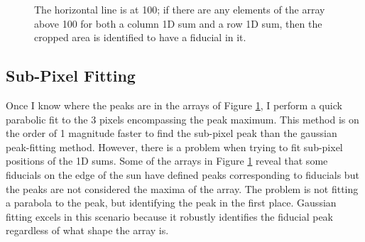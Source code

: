 \documentclass[10pt]{scrartcl}
\begin{document}
\begin{figure}[!ht]
\begin{subfigure}[b]{.3\linewidth}
    \end{subfigure}
    \caption{The horizontal line is at 100; if there are any elements of the array above 100 for both a column 1D sum and a row 1D sum, then the cropped area is identified to have a fiducial in it.}
    \label{lotsofplot}
\end{figure}

\subsection{Sub-Pixel Fitting} %
\label{sub:sub_pixel_fitting}
Once I know where the peaks are in the arrays of Figure \ref{lotsofplot}, I perform a quick parabolic fit to the 3 pixels encompassing the peak maximum. This method is on the order of 1 magnitude faster to find the sub-pixel peak than the gaussian peak-fitting method. However, there is a problem when trying to fit sub-pixel positions of the 1D sums. Some of the arrays in Figure \ref{lotsofplot} reveal that some fiducials on the edge of the sun have defined peaks corresponding to fiducials but the peaks are not considered the maxima of the array. The problem is not fitting a parabola to the peak, but identifying the peak in the first place. Gaussian fitting excels in this scenario because it robustly identifies the fiducial peak regardless of what shape the array is. 



\end{document}
